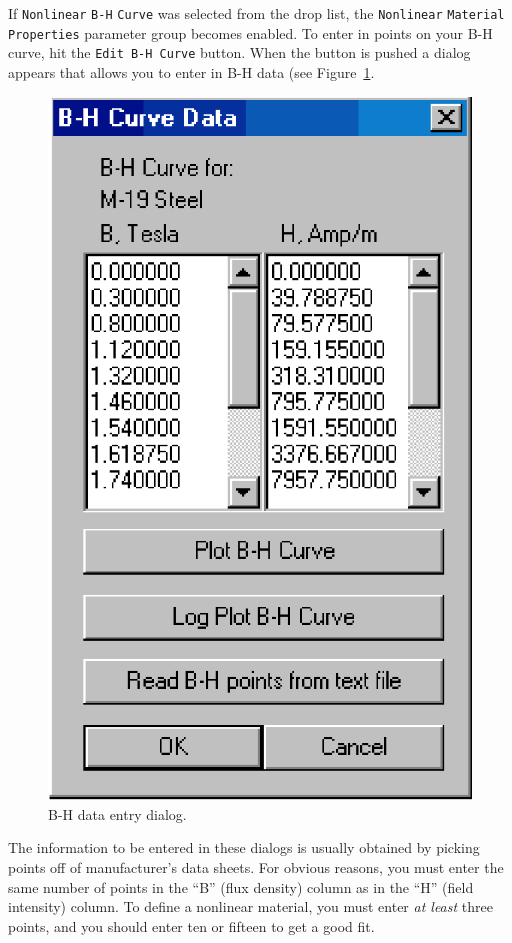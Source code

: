 \documentclass[12pt]{report}
\begin{document}
If {\tt Nonlinear} {\tt B-H} {\tt Curve} was selected from the drop list,
the {\tt Nonlinear} {\tt Material} {\tt Properties} parameter group becomes enabled.  To
enter in points on your B-H curve, hit the {\tt Edit B-H Curve} button.  When
the button is pushed a dialog appears that allows you to enter in
B-H data (see Figure~\ref{bhdatadlg}.
\begin{figure}[ht]
\centerline{\includegraphics{bhdata.ps}}
\caption{B-H data entry dialog.}
\label{bhdatadlg}
\end{figure}
The information to be entered in these dialogs is usually obtained
by picking points off of manufacturer's data sheets.  For obvious
reasons, you must enter the same number of points in the ``B''
(flux density) column as in the ``H'' (field intensity) column.  To
define a nonlinear material, you must enter {\em at least} three
points, and you should enter ten or fifteen to get a good fit.
\end{document}
